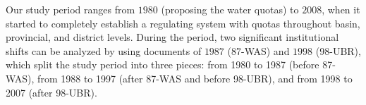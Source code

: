 Our study period ranges from $1980$ (proposing the water quotas) to $2008$, when it started to completely establish a regulating system with quotas throughout basin, provincial, and district levels.
During the period, two significant institutional shifts can be analyzed by using documents of $1987$ (87-WAS) and $1998$ (98-UBR), which split the study period into three pieces: from 1980 to 1987 (before 87-WAS), from 1988 to 1997 (after 87-WAS and before 98-UBR), and from 1998 to 2007 (after 98-UBR).
